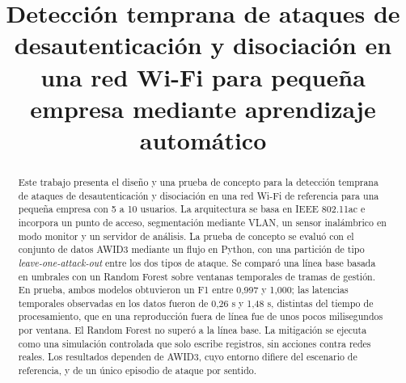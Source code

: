 \documentclass[journal]{IEEEtran}
\begin{document}
\title{Detección temprana de ataques de desautenticación y disociación en una red Wi-Fi para pequeña empresa mediante aprendizaje automático}

\author{
}

\maketitle

\begin{abstract}
Este trabajo presenta el diseño y una prueba de concepto para la detección temprana de ataques de desautenticación y disociación en una red Wi-Fi de referencia para una pequeña empresa con 5 a 10 usuarios. La arquitectura se basa en IEEE 802.11ac e incorpora un punto de acceso, segmentación mediante VLAN, un sensor inalámbrico en modo monitor y un servidor de análisis. La prueba de concepto se evaluó con el conjunto de datos AWID3 mediante un flujo en Python, con una partición de tipo \textit{leave-one-attack-out} entre los dos tipos de ataque. Se comparó una línea base basada en umbrales con un Random Forest sobre ventanas temporales de tramas de gestión. En prueba, ambos modelos obtuvieron un F1 entre 0,997 y 1,000; las latencias temporales observadas en los datos fueron de 0,26 s y 1,48 s, distintas del tiempo de procesamiento, que en una reproducción fuera de línea fue de unos pocos milisegundos por ventana. El Random Forest no superó a la línea base. La mitigación se ejecuta como una simulación controlada que solo escribe registros, sin acciones contra redes reales. Los resultados dependen de AWID3, cuyo entorno difiere del escenario de referencia, y de un único episodio de ataque por sentido.


\end{abstract}
\end{document}
